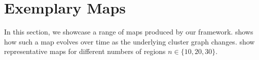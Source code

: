 \section{Exemplary Maps}
\label{sect:exemplary-maps}

In this section, we showcase a range of maps produced by our framework.
 shows how such a map evolves over time as the underlying cluster graph changes.
 show representative maps for different numbers of regions $n \in \{10,20,30\}$.

\newcommand{\bigdrawing}[1]{\setlength\fboxsep{0pt}\colorbox{gray!10}{\makebox(190,190){\texttt{[image: \#1]}}}}
\newcommand{\smalldrawing}[1]{\setlength\fboxsep{0pt}\colorbox{gray!10}{\makebox(120,111){\texttt{[image: \#1]}}}}

